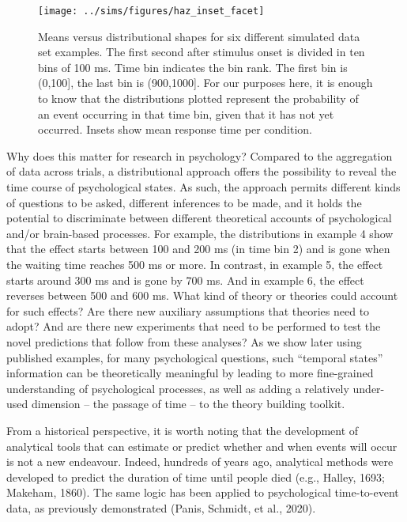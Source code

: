 \documentclass[
  man, donotrepeattitle,floatsintext]{apa6}
\begin{document}
\begin{figure}[H]

{\centering \texttt{[image: ../sims/figures/haz\_inset\_facet]} 

}

\caption{Means versus distributional shapes for six different simulated data set examples. The first second after stimulus onset is divided in ten bins of 100 ms. Time bin indicates the bin rank. The first bin is (0,100{]}, the last bin is (900,1000{]}. For our purposes here, it is enough to know that the distributions plotted represent the probability of an event occurring in that time bin, given that it has not yet occurred. Insets show mean response time per condition.}\label{fig:plot1}
\end{figure}

Why does this matter for research in psychology? Compared to the aggregation of data across trials, a distributional approach offers the possibility to reveal the time course of psychological states. As such, the approach permits different kinds of questions to be asked, different inferences to be made, and it holds the potential to discriminate between different theoretical accounts of psychological and/or brain-based processes.
For example, the distributions in example 4 show that the effect starts between 100 and 200 ms (in time bin 2) and is gone when the waiting time reaches 500 ms or more. In contrast, in example 5, the effect starts around 300 ms and is gone by 700 ms. And in example 6, the effect reverses between 500 and 600 ms. What kind of theory or theories could account for such effects? Are there new auxiliary assumptions that theories need to adopt? And are there new experiments that need to be performed to test the novel predictions that follow from these analyses? As we show later using published examples, for many psychological questions, such ``temporal states'' information can be theoretically meaningful by leading to more fine-grained understanding of psychological processes, as well as adding a relatively under-used dimension -- the passage of time -- to the theory building toolkit.

From a historical perspective, it is worth noting that the development of analytical tools that can estimate or predict whether and when events will occur is not a new endeavour.
Indeed, hundreds of years ago, analytical methods were developed to predict the duration of time until people died (e.g., Halley, 1693; Makeham, 1860).
The same logic has been applied to psychological time-to-event data, as previously demonstrated (Panis, Schmidt, et al., 2020).
\end{document}
